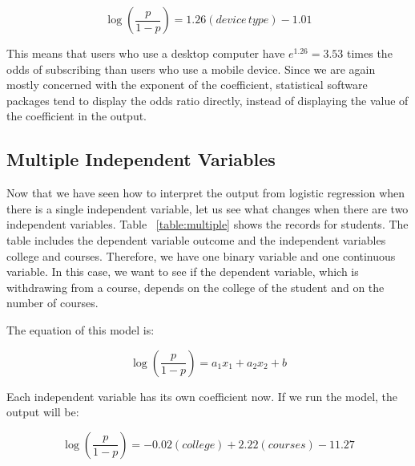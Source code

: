 \documentclass[a4paper,12pt,oneside]{book}
\begin{document}
$$ \log(\frac{p}{1-p})=1.26(device\, type)-1.01 $$

This means that users who use a desktop computer have $e^{1.26}=3.53$ times the odds of subscribing than users who use a mobile device. Since we are again mostly concerned with the exponent 
of the coefficient, statistical software packages tend to display the odds ratio directly, instead of displaying the value of the coefficient in the output.
\subsection{Multiple Independent Variables} 
Now that we have seen how to interpret the output from logistic regression when there is a single independent variable, let us see what changes when there are two independent variables. 
Table ~\ref{table:multiple} shows the records for students. The table includes the dependent variable outcome and the independent variables college and courses. Therefore, we have one binary variable and one continuous variable.
In this case, we want to see if the dependent variable, which is withdrawing from a course, depends on the college of the student and on the number of courses. 

The equation of this model is:

$$ \log(\frac{p}{1-p})=a_1x_1+a_2x_2+b $$

Each independent variable has its own coefficient now. If we run the model, the output will be:

$$ \log(\frac{p}{1-p})=-0.02(college)+2.22(courses)-11.27 $$
\end{document}
